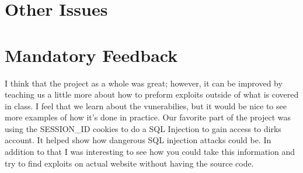 \documentclass[12pt]{article}
\begin{document}
\subsection{}
\section{Other Issues}

\section{Mandatory Feedback}
I think that the project as a whole was great; however, it can be improved by teaching us a little more about how to preform exploits outside of what is covered in class. I feel that we learn about the vunerabilies, but it would be nice to see more examples of how it's done in practice. Our favorite part of the project was using the SESSION\_ID cookies to do a SQL Injection to gain access to dirks account. It helped show how dangerous SQL injection attacks could be. In addition to that I was interesting to see how you could take this information and try to find exploits on actual website without having the source code.
\end{document}
